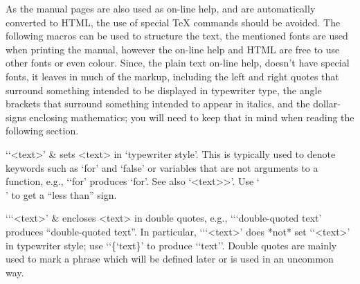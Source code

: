 \indextt{\\lq}\indextt{\\pif}\indextt{\\rq}
\indextt{\\>}\indextt{\\index}\indextt{\\indextt}
\indextt{\\atindex}
\indextt{\\fmark}
\indextt{\\URL}\indextt{\\Mailto}
\indextt{\\Package}\indextt{\\package}
As the manual pages are also used as on-line help, and are  automatically
converted to HTML, the use of special {\TeX} commands should be  avoided.
The following macros can be used to structure  the  text,  the  mentioned
fonts are used when printing the manual, however  the  on-line  help  and
HTML are free to use other fonts or even colour. Since,  the  plain  text
on-line help, doesn't have special  fonts,  it  leaves  in  much  of  the
markup, including the left  and  right  quotes  that  surround  something
intended to be displayed in typewriter  type,  the  angle  brackets  that
surround something intended to appear in italics,  and  the  dollar-signs
enclosing mathematics; you will need to keep that in  mind  when  reading
the following section.

\beginitems

`\lq<text>\pif' &
    sets <text> in `typewriter style'.
    This is typically used to denote {\GAP} keywords such  as  `for'  and
    `false' or variables that are not  arguments  to  a  function,  e.g.,
    `{\lq}for\pif' produces `for'. 
    See also `\<<text>>'. 
    Use `\\\<' to get a ``less than'' sign.

`\lq\lq<text>\pif\pif' &
    encloses <text> in double quotes, 
    e.g., `\lq{\lq}double-quoted text\pif\pif' produces 
    ``double-quoted text''.
    In particular, `\lq\lq<text>\pif\pif' does *not* set  `\lq<text>\pif'
    in typewriter  style;  use  `{\lq\{{\lq}text\pif\}\pif}'  to  produce
    `{`text'}'. Double quotes are mainly used to mark a phrase which will
    be defined later or is used in an uncommon way.

